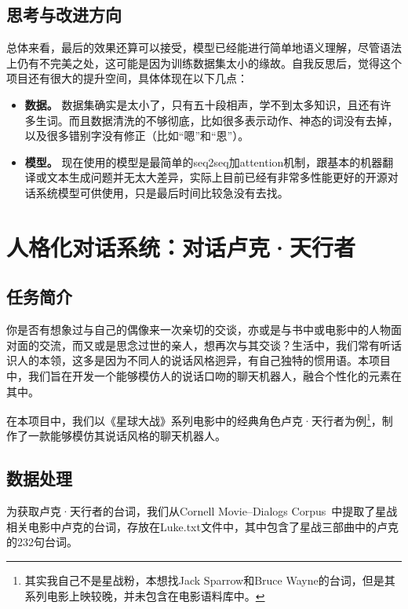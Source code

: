 \documentclass[12pt]{article} %
\begin{document}
\begin{sloppypar}
\subsection{思考与改进方向}

总体来看，最后的效果还算可以接受，模型已经能进行简单地语义理解，尽管语法上仍有不完美之处，这可能是因为训练数据集太小的缘故。自我反思后，觉得这个项目还有很大的提升空间，具体体现在以下几点：
\begin{itemize}
	\item {\bf 数据。} 数据集确实是太小了，只有五十段相声，学不到太多知识，且还有许多生词。而且数据清洗的不够彻底，比如很多表示动作、神态的词没有去掉，以及很多错别字没有修正（比如“嗯”和“恩”）。
	\item {\bf 模型。} 现在使用的模型是最简单的seq2seq加attention机制，跟基本的机器翻译或文本生成问题并无太大差异，实际上目前已经有非常多性能更好的开源对话系统模型可供使用，只是最后时间比较急没有去找。
\end{itemize}

\section{人格化对话系统：对话卢克·天行者}

\subsection{任务简介}

你是否有想象过与自己的偶像来一次亲切的交谈，亦或是与书中或电影中的人物面对面的交流，而又或是思念过世的亲人，想再次与其交谈？生活中，我们常有听话识人的本领，这多是因为不同人的说话风格迥异，有自己独特的惯用语。本项目中，我们旨在开发一个能够模仿人的说话口吻的聊天机器人，融合个性化的元素在其中。

在本项目中，我们以《星球大战》系列电影中的经典角色卢克·天行者为例\footnote{其实我自己不是星战粉，本想找Jack Sparrow和Bruce Wayne的台词，但是其系列电影上映较晚，并未包含在电影语料库中。}，制作了一款能够模仿其说话风格的聊天机器人。

\subsection{数据处理}

为获取卢克·天行者的台词，我们从Cornell Movie--Dialogs Corpus~\cite{Danescu-Niculescu-Mizil+Lee:11a}中提取了星战相关电影中卢克的台词，存放在Luke.txt文件中，其中包含了星战三部曲中的卢克的232句台词。


\end{sloppypar}
\end{document}

